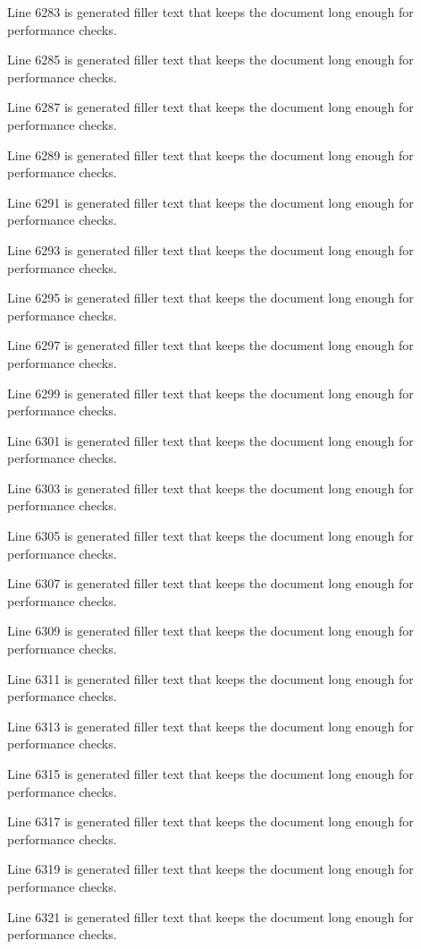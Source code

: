 Line 6283 is generated filler text that keeps the document long enough for performance checks.

Line 6285 is generated filler text that keeps the document long enough for performance checks.

Line 6287 is generated filler text that keeps the document long enough for performance checks.

Line 6289 is generated filler text that keeps the document long enough for performance checks.

Line 6291 is generated filler text that keeps the document long enough for performance checks.

Line 6293 is generated filler text that keeps the document long enough for performance checks.

Line 6295 is generated filler text that keeps the document long enough for performance checks.

Line 6297 is generated filler text that keeps the document long enough for performance checks.

Line 6299 is generated filler text that keeps the document long enough for performance checks.

Line 6301 is generated filler text that keeps the document long enough for performance checks.

Line 6303 is generated filler text that keeps the document long enough for performance checks.

Line 6305 is generated filler text that keeps the document long enough for performance checks.

Line 6307 is generated filler text that keeps the document long enough for performance checks.

Line 6309 is generated filler text that keeps the document long enough for performance checks.

Line 6311 is generated filler text that keeps the document long enough for performance checks.

Line 6313 is generated filler text that keeps the document long enough for performance checks.

Line 6315 is generated filler text that keeps the document long enough for performance checks.

Line 6317 is generated filler text that keeps the document long enough for performance checks.

Line 6319 is generated filler text that keeps the document long enough for performance checks.

Line 6321 is generated filler text that keeps the document long enough for performance checks.

